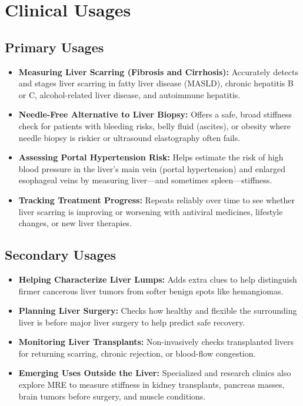\section{Clinical Usages}

\subsection{Primary Usages}
\begin{itemize}
\item \textbf{Measuring Liver Scarring (Fibrosis and Cirrhosis):} Accurately detects and stages liver scarring in fatty liver disease (MASLD), chronic hepatitis B or C, alcohol-related liver disease, and autoimmune hepatitis.
\item \textbf{Needle-Free Alternative to Liver Biopsy:} Offers a safe, broad stiffness check for patients with bleeding risks, belly fluid (ascites), or obesity where needle biopsy is riskier or ultrasound elastography often fails.
\item \textbf{Assessing Portal Hypertension Risk:} Helps estimate the risk of high blood pressure in the liver's main vein (portal hypertension) and enlarged esophageal veins by measuring liver---and sometimes spleen---stiffness.
\item \textbf{Tracking Treatment Progress:} Repeats reliably over time to see whether liver scarring is improving or worsening with antiviral medicines, lifestyle changes, or new liver therapies.
\end{itemize}

\subsection{Secondary Usages}
\begin{itemize}
\item \textbf{Helping Characterize Liver Lumps:} Adds extra clues to help distinguish firmer cancerous liver tumors from softer benign spots like hemangiomas.
\item \textbf{Planning Liver Surgery:} Checks how healthy and flexible the surrounding liver is before major liver surgery to help predict safe recovery.
\item \textbf{Monitoring Liver Transplants:} Non-invasively checks transplanted livers for returning scarring, chronic rejection, or blood-flow congestion.
\item \textbf{Emerging Uses Outside the Liver:} Specialized and research clinics also explore MRE to measure stiffness in kidney transplants, pancreas masses, brain tumors before surgery, and muscle conditions.
\end{itemize}

